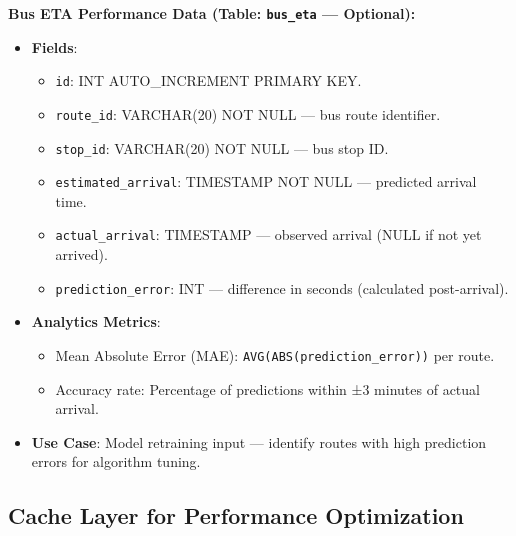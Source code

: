 \textbf{Bus ETA Performance Data (Table: \texttt{bus\_eta} — Optional):}
\begin{itemize}
    \item \textbf{Fields}:
    \begin{itemize}
        \item \texttt{id}: INT AUTO\_INCREMENT PRIMARY KEY.
        \item \texttt{route\_id}: VARCHAR(20) NOT NULL — bus route identifier.
        \item \texttt{stop\_id}: VARCHAR(20) NOT NULL — bus stop ID.
        \item \texttt{estimated\_arrival}: TIMESTAMP NOT NULL — predicted arrival time.
        \item \texttt{actual\_arrival}: TIMESTAMP — observed arrival (NULL if not yet arrived).
        \item \texttt{prediction\_error}: INT — difference in seconds (calculated post-arrival).
    \end{itemize}
    \item \textbf{Analytics Metrics}:
    \begin{itemize}
        \item Mean Absolute Error (MAE): \texttt{AVG(ABS(prediction\_error))} per route.
        \item Accuracy rate: Percentage of predictions within ±3 minutes of actual arrival.
    \end{itemize}
    \item \textbf{Use Case}: Model retraining input — identify routes with high prediction errors for algorithm tuning.
\end{itemize}

\subsection{Cache Layer for Performance Optimization}

